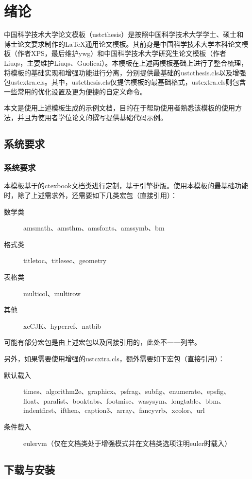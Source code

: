 ﻿
\chapter{绪论}
\label{chap:introduction}

中国科学技术大学论文模板（ustcthesis）是按照中国科学技术大学学士、硕士和博士论文要求制作的\LaTeX 通用论文模板。其前身是中国科学技术大学本科论文模板（作者XPS，最后维护ywg）和中国科学技术大学研究生论文模板（作者Liuqs，主要维护Liuqs、Guolicai）。本模板在上述两模板基础上进行了整合梳理，将模板的基础实现和增强功能进行分离，分别提供最基础的ustcthesis.cls以及增强包ustcxtra.cls。其中，ustcthesis.cls仅提供模板的最基础格式，ustcxtra.cls则包含一些常用的优化设置及更为便捷的自定义命令。

本文是使用上述模板生成的示例文档，目的在于帮助使用者熟悉该模板的使用方法，并且为使用者学位论文的撰写提供基础代码示例。

\section{系统要求}
\subsection{系统要求}
本模板基于\CTeX 的ctexbook文档类进行定制，基于\XeTeX 引擎排版。使用本模板的最基础功能时，除了上述需求外，还需要如下几类宏包（直接引用）：
\begin{description}
\item[数学类]{amsmath、amsthm、amsfonts、amssymb、bm}
\item[格式类]{titletoc、titlesec、geometry}
\item[表格类]{multicol、multirow}
\item[其他]{xeCJK、hyperref、natbib}
\end{description}
可能有部分宏包是由上述宏包以及\CTeX 间接引用的，此处不一一列举。

另外，如果需要使用增强的ustcxtra.cls，额外需要如下宏包（直接引用）：
\begin{description}
\item[默认载入]{times、algorithm2e、graphicx、psfrag、subfig、enumerate、epsfig、float、paralist、booktabs、footmisc、wasysym、longtable、bbm、indentfirst、ifthen、caption3、array、fancyvrb、xcolor、url}
\item[条件载入]{eulervm（仅在文档类处于增强模式并在文档类选项注明euler时载入）}
\end{description}

\section{下载与安装}

